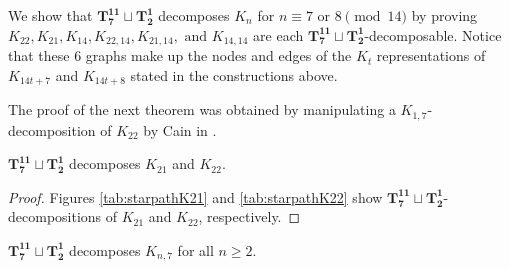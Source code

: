 \documentclass{dmgt}
\begin{document}
We show that $\mathbf{T_{7}^{11}}\sqcup\mathbf{T_{2}^{1}}$ decomposes $K_{n}$ for $n\equiv7 \textrm{ or }8\pmod{14}$ by proving $K_{22},K_{21},K_{14},K_{22,14},K_{21,14},\text{ and }K_{14,14}$ are each $\mathbf{T_{7}^{11}}\sqcup\mathbf{T_{2}^{1}}$-decomposable. Notice that these 6 graphs make up the nodes and edges of the $K_{t}$ representations of $K_{14t+7}$ and $K_{14t+8}$ stated in the constructions above.

\noindent The proof of the next theorem was obtained by manipulating a $K_{1,7}$-decomposition of $K_{22}$ by Cain in \cite{bib:Cain}.

\begin{theorem}\label{thm:PCstarpath}
    $\mathbf{T_{7}^{11}}\sqcup\mathbf{T_{2}^{1}}$ decomposes $K_{21}$ and $K_{22}$.
\end{theorem}

\begin{proof}
     Figures \ref{tab:starpathK21} and \ref{tab:starpathK22} show $\mathbf{T_{7}^{11}}\sqcup\mathbf{T_{2}^{1}}$-decompositions of $K_{21}$ and $K_{22}$, respectively.  
     
\end{proof}

\begin{theorem} \label{thm:K_n,7}
    $\mathbf{T_{7}^{11}}\sqcup\mathbf{T_{2}^{1}}$ decomposes $K_{n,7}$ for all $n\geq 2$.
\end{theorem}
\end{document}
